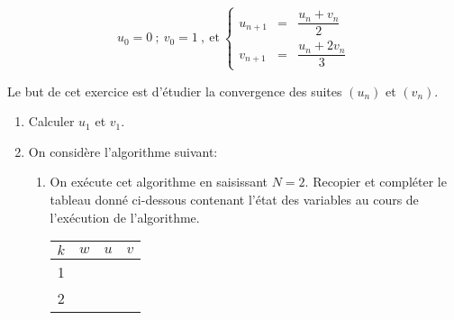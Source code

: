 \documentclass[10pt]{article}
\begin{document}
\[
u_0=0~;~v_0=1~,~\text{et}~
\left\{
\begin{array}{rcl}
u_{n+1}&=&\dfrac{u_n+v_n}{2}\\
v_{n+1}&=&\dfrac{u_n+2v_n}{3}
\end{array}
\right.\]

Le but de cet exercice est d'étudier la convergence des suites $\left(u_n\right)$ et $\left(v_n\right)$.

\medskip

\begin{enumerate}
\item
Calculer $u_1$ et $v_1$.
\item On considère l'algorithme suivant:
\begin{center}
\end{center}
	\begin{enumerate}
		\item On exécute cet algorithme en saisissant $N = 2$. Recopier et compléter le tableau donné ci-dessous contenant l'état des variables au cours de l'exécution de l'algorithme.
\begin{center}
\begin{tabular}{|c|c|c|c|}
\hline
$k$ & $w$ & $u$ & $v$ \\
\hline
1& & & \\
\hline
2& & & \\
\hline
\end{tabular}

\end{center}
\end{enumerate}
\end{enumerate}
\end{document}
